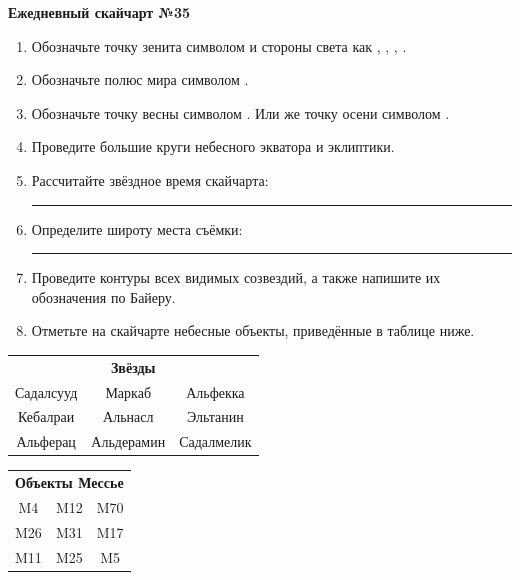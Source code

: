 \documentclass{./SAS-class-skygen}
\begin{document}
    
    
    
	\begin{center}
		\large\textbf{Ежедневный скайчарт №35}
	\end{center}

	\begin{enumerate}
		\item Обозначьте точку зенита символом  и стороны света как , , , .
		\item Обозначьте полюс мира символом .
		\item Обозначьте точку весны символом \Aries. Или же точку осени символом \Libra.
		\item Проведите большие круги небесного экватора и эклиптики.
		\item Рассчитайте звёздное время скайчарта: \rule{2cm}{0.4pt}
		\item Определите широту места съёмки: \rule{2cm}{0.4pt}
		\item Проведите контуры всех видимых созвездий, а также напишите их обозначения по Байеру.
		\item Отметьте на скайчарте небесные объекты, приведённые в таблице ниже.
	\end{enumerate}
	
    \vspace{0.5cm}

    \begin{table}[h!]
    \centering
    \begin{tabular}{ccc}
    \multicolumn{3}{c}{\textbf{Звёзды}} \\ Садалсууд & Маркаб & Альфекка \\
Кебалраи & Альнасл & Эльтанин \\
Альферац & Альдерамин & Садалмелик \\

\end{tabular}
    \hfill
    \begin{tabular}{ccc}
    \multicolumn{3}{c}{\textbf{Объекты Мессье}} \\ M4 & M12 & M70 \\
M26 & M31 & M17 \\
M11 & M25 & M5 \\

\end{tabular}
    \end{table}
	
\end{document}
